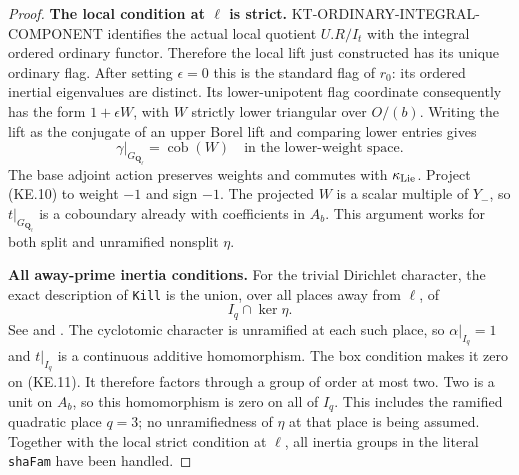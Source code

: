 \documentclass[11pt,a4paper]{article}
\theoremstyle{definition}
\renewcommand{\paragraph}[1]{\par\smallskip\noindent\textbf{#1}\quad\ignorespaces}
\begin{document}
\begin{proof}
\paragraph{The local condition at $\ell$ is strict.}
KT-ORDINARY-INTEGRAL-COMPONENT identifies the actual local
quotient $U.R/I_t$ with the integral ordered ordinary
functor.  Therefore the local lift just constructed has
its unique ordinary flag.  After setting $\epsilon=0$
this is the standard flag of $r_0$: its ordered inertial
eigenvalues are distinct.  Its lower-unipotent flag
coordinate consequently has the form $1+\epsilon W$,
with $W$ strictly lower triangular over $O/(b)$.
Writing the lift as the conjugate of an upper Borel
lift and comparing lower entries gives
\[
       \gamma|_{G_{\mathbf Q_\ell}}
            =\operatorname{cob}(W)
                       \quad\text{in the lower-weight space}.
                                                                  \tag{KE.10}
\]
The base adjoint action preserves weights and commutes
with $\kappa_{\rm Lie}$.  Project (KE.10) to weight $-1$
and sign $-1$.  The projected $W$ is a scalar multiple
of $Y_-$, so $t|_{G_{\mathbf Q_\ell}}$ is a coboundary
already with coefficients in $A_b$.  This argument works
for both split and unramified nonsplit $\eta$.

\paragraph{All away-prime inertia conditions.}
For the trivial Dirichlet character, the exact
 description of
\texttt{Kill} is the union, over all places away from
$\ell$, of
\[
                        I_q\cap\ker\eta .                  \tag{KE.11}
\]
See  and
.
The cyclotomic character is unramified at each such
place, so $\alpha|_{I_q}=1$ and $t|_{I_q}$ is a
continuous additive homomorphism.  The box condition
makes it zero on (KE.11).  It therefore factors through
a group of order at most two.  Two is a unit on $A_b$,
so this homomorphism is zero on all of $I_q$.  This
includes the ramified quadratic place $q=3$; no
unramifiedness of $\eta$ at that place is being assumed.
Together with the local strict condition at $\ell$,
all inertia groups in the literal \texttt{shaFam} have
been handled.


\end{proof}
\end{document}
